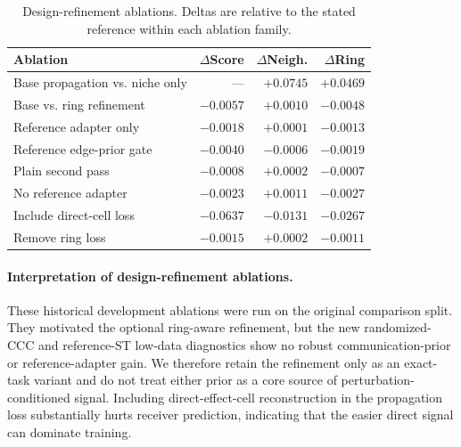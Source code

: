 \documentclass[sigconf,review,balance=false]{acmart}
\begin{document}
\begin{table}[t]
\centering
\caption{Design-refinement ablations. Deltas are relative to the stated reference within each ablation family.}
\label{tab:app_design_refinement_ablations}
\small
\setlength{\tabcolsep}{1.6pt}
\renewcommand{\arraystretch}{1.05}
\begin{tabularx}{\linewidth}{@{}>{\raggedright\arraybackslash}Xrrr@{}}
\toprule
Ablation & $\Delta$Score & $\Delta$Neigh. & $\Delta$Ring \\
\midrule
Base propagation vs. niche only & --- & $+0.0745$ & $+0.0469$ \\
Base vs. ring refinement        & $-0.0057$ & $+0.0010$ & $-0.0048$ \\
Reference adapter only          & $-0.0018$ & $+0.0001$ & $-0.0013$ \\
Reference edge-prior gate       & $-0.0040$ & $-0.0006$ & $-0.0019$ \\
Plain second pass               & $-0.0008$ & $+0.0002$ & $-0.0007$ \\
No reference adapter            & $-0.0023$ & $+0.0011$ & $-0.0027$ \\
Include direct-cell loss        & $-0.0637$ & $-0.0131$ & $-0.0267$ \\
Remove ring loss                & $-0.0015$ & $+0.0002$ & $-0.0011$ \\
\bottomrule
\end{tabularx}
\end{table}





\paragraph{Interpretation of design-refinement ablations.}
These historical development ablations were run on the original comparison
split. They motivated the optional ring-aware refinement, but the new
randomized-CCC and reference-ST low-data diagnostics show no robust
communication-prior or reference-adapter gain. We therefore retain the
refinement only as an exact-task variant and do not treat either prior as a
core source of perturbation-conditioned signal. Including direct-effect-cell
reconstruction in the propagation loss substantially hurts receiver
prediction, indicating that the easier direct signal can dominate training.
\end{document}
